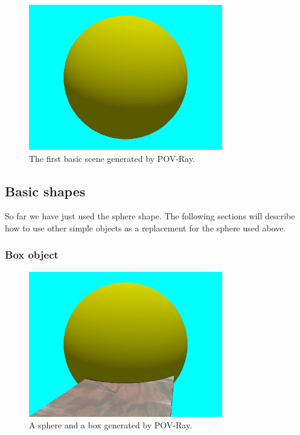 \documentclass[fleqn,10pt]{wlscirep}
\newcommand*{\PV}{POV-Ray}
\begin{document}
\begin{figure}[htbp]
\centering
\includegraphics[width=20pc,clip]{FIG2}
\caption{The first basic scene generated by \PV.}
\label{fig:FIG2}
\end{figure}

\subsection{Basic shapes}
So far we have just used the sphere shape. The following sections will describe how to use other simple objects as a replacement for the sphere used above.
\subsubsection{Box object}

\begin{figure}[htbp]
\centering
\includegraphics[width=20pc,clip]{FIG3}
\caption{A sphere and a box generated by \PV.}
\label{fig:FIG3}
\end{figure}
\end{document}
